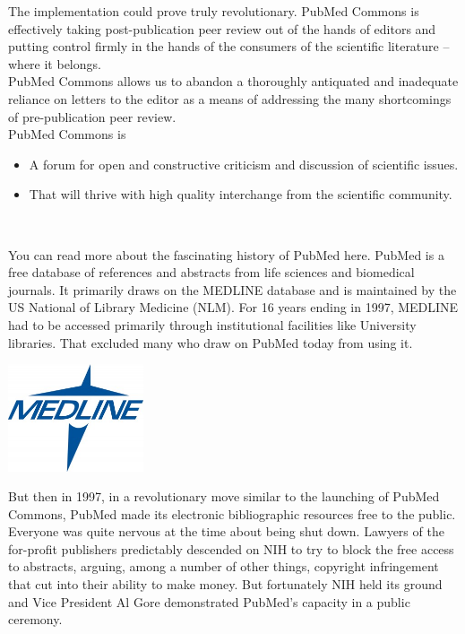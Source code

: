 \documentclass[11pt,twoside,a4paper]{article}
\begin{document}
The implementation could prove truly revolutionary. PubMed Commons is effectively taking post-publication peer review out of the hands of editors and putting control firmly in the hands of the consumers of the scientific literature -- where it belongs. ~\\

PubMed Commons allows us to abandon a thoroughly antiquated and inadequate reliance on letters to the editor as a means of addressing the many shortcomings of pre-publication peer review. ~\\

PubMed Commons is
\begin{itemize}
	\item A forum for open and constructive criticism and discussion of scientific issues.
	\item That will thrive with high quality interchange from the scientific community.
\end{itemize} ~\\

\begin{minipage}[h]{13.75cm}
	You can read more about the fascinating history of PubMed here.  PubMed is a free database of references and abstracts from life sciences and biomedical journals. It primarily draws on the MEDLINE database and is maintained by the US National of Library Medicine (NLM). For 16 years ending in 1997, MEDLINE had to be accessed primarily through institutional facilities like University libraries. That excluded many  who draw on PubMed today from using it. ~\\
\end{minipage} \hfill \begin{minipage}[h]{5.25cm}
	\hfill \includegraphics[width=4.00cm]{img/Medline287-300x237.jpg}
\end{minipage}

But then in 1997, in a revolutionary move similar to the launching of PubMed Commons, PubMed made its electronic bibliographic resources free to the public. Everyone was quite nervous at the time about being shut down. Lawyers of the for-profit publishers predictably descended on NIH to try to block the free access to abstracts, arguing, among a number of other things, copyright infringement that cut into their ability to make money. But fortunately NIH held its ground and Vice President Al Gore demonstrated PubMed's capacity in a public ceremony. ~\\
\end{document}
